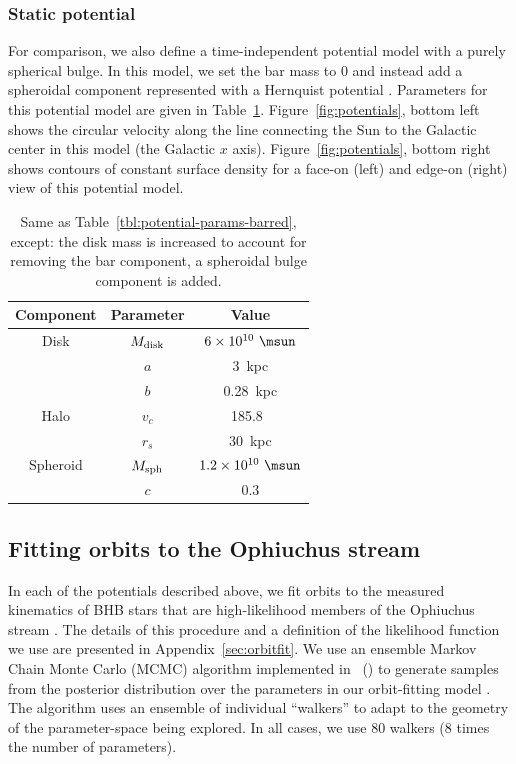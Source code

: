 \documentclass[letterpaper,12pt,preprint]{aastex}
\begin{document}
\subsubsection{Static potential}

For comparison, we also define a time-independent potential model with a purely spherical bulge. In this model, we set the bar mass to 0 and instead add a spheroidal component represented with a Hernquist potential \citep{hernquist90}. Parameters for this potential model are given in Table~\ref{tbl:potential-params-static}. Figure~\ref{fig:potentials}, bottom left shows the circular velocity along the line connecting the Sun to the Galactic center in this model (the Galactic $x$ axis). Figure~\ref{fig:potentials}, bottom right shows contours of constant surface density for a face-on (left) and edge-on (right) view of this potential model.

\begin{table}[ht]
\begin{center}
	\begin{tabular}{ c | c | c }
	         \toprule
	         Component & Parameter & Value \\\toprule
		Disk & $M_{\rm disk}$ & $6 \times 10^{10}~\msun$ \\
		& $a$ & 3~{\rm kpc}\\
		& $b$ & 0.28~{\rm kpc} \\\midrule
	         Halo & $v_c$ & 185.8~\kms\\
		& $r_s$ & 30~kpc \\\midrule
		Spheroid & $M_{\rm sph}$ & $1.2 \times 10^{10}~\msun$ \\
		& $c$ & 0.3 \\
		\bottomrule
		\end{tabular}
	\caption{Same as Table~\ref{tbl:potential-params-barred}, except: the disk mass is increased to account for removing the bar component, a spheroidal bulge component is added. \label{tbl:potential-params-static}}
\end{center}
\end{table}

\subsection{Fitting orbits to the Ophiuchus stream}

In each of the potentials described above, we fit orbits to the measured kinematics of BHB stars that are high-likelihood members of the Ophiuchus stream \citep{sesar15a, sesar15b}. The details of this procedure and a definition of the likelihood function we use are presented in Appendix~\ref{sec:orbitfit}. We use an ensemble Markov Chain Monte Carlo (MCMC) algorithm \citep{goodman10} implemented in \python\ () to generate samples from the posterior distribution over the parameters in our orbit-fitting model \citep{foremanmackey13}. The algorithm uses an ensemble of individual ``walkers'' to adapt to the geometry of the parameter-space being explored. In all cases, we use 80 walkers (8 times the number of parameters).
\end{document}
